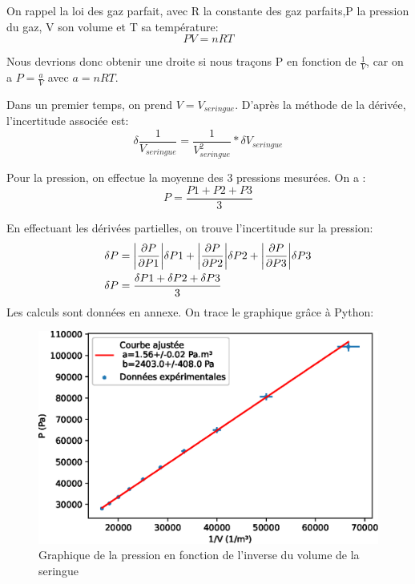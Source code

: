 \documentclass[12pt]{article}
\begin{document}
On rappel la loi des gaz parfait, avec R la constante des gaz parfaits,P la pression du gaz, V son volume et T sa température:
\begin{equation}
PV=nRT
\end{equation}

Nous devrions donc obtenir une droite si nous traçons P en fonction de $\frac{1}{V}$, car on a $P=\frac{a}{V}$ avec $a=nRT$.  

Dans un premier temps, on prend $V=V_{seringue}$. D'après la méthode de la dérivée, l'incertitude associée est:
\begin{equation}
\delta \frac{1}{V_{seringue}}=\frac{1}{V_{seringue}^2}*\delta V_{seringue}
\end{equation}

Pour la pression, on effectue la moyenne des 3 pressions mesurées. On a :
\begin{equation}
P=\frac{P1+P2+P3}{3}
\end{equation}

En effectuant les dérivées partielles, on trouve l'incertitude sur la pression:
\begin{align*}
\delta P &= \abs{\frac{\partial P}{\partial P1}} \delta P1 +\abs{\frac{\partial P}{\partial P2}} \delta P2 +\abs{\frac{\partial P}{\partial P3}} \delta P3 \\
\delta P &= \frac{\delta P1 +\delta P2 +\delta P3}{3}
\end{align*}
\newpage
Les calculs sont données en annexe. On trace le graphique grâce à Python:
\begin{figure}[h!]
	\begin{center}
		\includegraphics[scale=1]{img/GExp1.eps}
		\caption{Graphique de la pression en fonction de l'inverse du volume de la seringue}
	\end{center}
\end{figure}
\end{document}
